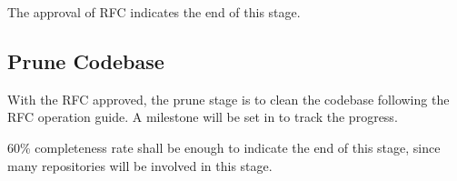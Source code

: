 The approval of RFC indicates the end of this stage.

\subsection{Prune Codebase}\label{subsec:prune}

With the RFC approved, the prune stage is to clean the codebase following the RFC operation guide. A milestone will be set in \repoimages{} to track the progress.

60\% completeness rate shall be enough to indicate the end of this stage, since many repositories will be involved in this stage.

